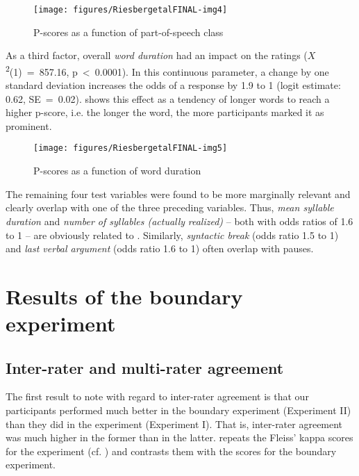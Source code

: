 \documentclass[output=paper
,modfonts
,nonflat]{langsci/langscibook}
\begin{document}
\begin{figure}
		\texttt{[image: figures/RiesbergetalFINAL-img4]}
		\caption{P-scores as a function of part-of-speech class}
		\label{f:riesberg:4}
\end{figure}

As a third factor, overall \textit{word duration} had an impact on the  ratings (\textit{$X$}\textsuperscript{2}(1)~=~857.16, p~<~0.0001). In this continuous parameter, a change by one standard deviation increases the odds of a  response by 1.9 to 1 (logit estimate: 0.62, SE~=~0.02).  shows this effect as a tendency of longer words to reach a higher p-score, i.e. the longer the word, the more participants marked it as prominent. 

\begin{figure}
		\texttt{[image: figures/RiesbergetalFINAL-img5]}
		\caption{P-scores as a function of word duration}
		\label{f:riesberg:5}
\end{figure}

\noindent
The remaining four test variables were found to be more marginally relevant and clearly overlap with one of the three preceding variables. Thus, \textit{mean syllable duration} and \textit{number of syllables (actually} \textit{realized)} – both with odds ratios of 1.6 to 1 – are obviously related to . Similarly, \textit{syntactic break} (odds ratio 1.5 to 1) and \textit{last verbal argument} (odds ratio 1.6 to 1) often overlap with pauses.

\section{\label{s:riesberg:4}Results of the boundary experiment}

\subsection{\label{s:riesberg:4.1}Inter-rater and multi-rater agreement}

The first result to note with regard to inter-rater agreement is that our participants performed much better in the boundary experiment (Experiment II) than they did in the  experiment (Experiment I). That is, inter-rater agreement was much higher in the former than in the latter.  repeats the Fleiss’ kappa scores for the  experiment (cf. ) and contrasts them with the scores for the boundary experiment.
\end{document}
